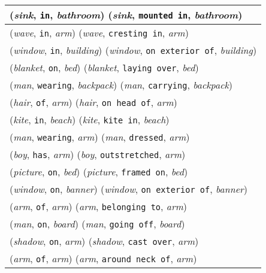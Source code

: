 \documentclass[runningheads]{llncs}
\begin{document}
{\begin{longtable}{ l }
(\textit{sink}, \texttt{in}, \textit{bathroom})  (\textit{sink}, \texttt{mounted in}, \textit{bathroom}) \\ \hline
(\textit{wave}, \texttt{in}, \textit{arm})  (\textit{wave}, \texttt{cresting in}, \textit{arm}) \\ \hline
(\textit{window}, \texttt{in}, \textit{building})  (\textit{window}, \texttt{on exterior of}, \textit{building}) \\ \hline
(\textit{blanket}, \texttt{on}, \textit{bed})  (\textit{blanket}, \texttt{laying over}, \textit{bed}) \\ \hline
(\textit{man}, \texttt{wearing}, \textit{backpack})  (\textit{man}, \texttt{carrying}, \textit{backpack}) \\ \hline
(\textit{hair}, \texttt{of}, \textit{arm})  (\textit{hair}, \texttt{on head of}, \textit{arm}) \\ \hline
(\textit{kite}, \texttt{in}, \textit{beach})  (\textit{kite}, \texttt{kite in}, \textit{beach}) \\ \hline
(\textit{man}, \texttt{wearing}, \textit{arm})  (\textit{man}, \texttt{dressed}, \textit{arm}) \\ \hline
(\textit{boy}, \texttt{has}, \textit{arm})  (\textit{boy}, \texttt{outstretched}, \textit{arm}) \\ \hline
(\textit{picture}, \texttt{on}, \textit{bed})  (\textit{picture}, \texttt{framed on}, \textit{bed}) \\ \hline
(\textit{window}, \texttt{on}, \textit{banner})  (\textit{window}, \texttt{on exterior of}, \textit{banner}) \\ \hline
(\textit{arm}, \texttt{of}, \textit{arm})  (\textit{arm}, \texttt{belonging to}, \textit{arm}) \\ \hline
(\textit{man}, \texttt{on}, \textit{board})  (\textit{man}, \texttt{going off}, \textit{board}) \\ \hline
(\textit{shadow}, \texttt{on}, \textit{arm})  (\textit{shadow}, \texttt{cast over}, \textit{arm}) \\ \hline
(\textit{arm}, \texttt{of}, \textit{arm})  (\textit{arm}, \texttt{around neck of}, \textit{arm}) \\ \hline
\end{longtable}
}
\end{document}

